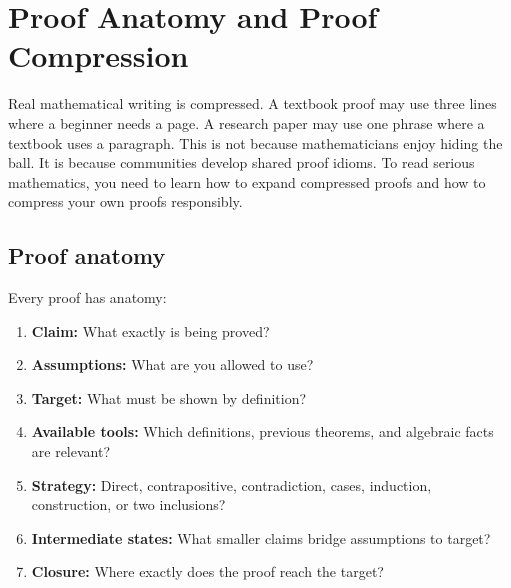 \section{Proof Anatomy and Proof Compression}

Real mathematical writing is compressed. A textbook proof may use three lines where a beginner needs a page. A research paper may use one phrase where a textbook uses a paragraph. This is not because mathematicians enjoy hiding the ball. It is because communities develop shared proof idioms. To read serious mathematics, you need to learn how to expand compressed proofs and how to compress your own proofs responsibly.

\subsection{Proof anatomy}

Every proof has anatomy:

\begin{enumerate}
\item \textbf{Claim:} What exactly is being proved?
\item \textbf{Assumptions:} What are you allowed to use?
\item \textbf{Target:} What must be shown by definition?
\item \textbf{Available tools:} Which definitions, previous theorems, and algebraic facts are relevant?
\item \textbf{Strategy:} Direct, contrapositive, contradiction, cases, induction, construction, or two inclusions?
\item \textbf{Intermediate states:} What smaller claims bridge assumptions to target?
\item \textbf{Closure:} Where exactly does the proof reach the target?
\end{enumerate}

\begin{center}
\end{center}

